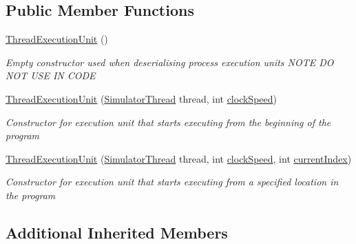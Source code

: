 \subsection*{Public Member Functions}
\begin{DoxyCompactItemize}
\item 
\hyperlink{class_c_p_u___o_s___simulator_1_1_operating___system_1_1_threading_1_1_thread_execution_unit_a7746c86206a5f1532a384792edfde2ae}{Thread\+Execution\+Unit} ()
\begin{DoxyCompactList}\small\item\em Empty constructor used when deserialising process execution units N\+O\+T\+E D\+O N\+O\+T U\+S\+E I\+N C\+O\+D\+E \end{DoxyCompactList}\item 
\hyperlink{class_c_p_u___o_s___simulator_1_1_operating___system_1_1_threading_1_1_thread_execution_unit_a68311fa0eed9a84bacba7743074e77fb}{Thread\+Execution\+Unit} (\hyperlink{class_c_p_u___o_s___simulator_1_1_operating___system_1_1_threading_1_1_simulator_thread}{Simulator\+Thread} thread, int \hyperlink{class_c_p_u___o_s___simulator_1_1_c_p_u_1_1_execution_unit_a0deb0a3e0c9fa402598bbf18be6535cc}{clock\+Speed})
\begin{DoxyCompactList}\small\item\em Constructor for execution unit that starts executing from the beginning of the program \end{DoxyCompactList}\item 
\hyperlink{class_c_p_u___o_s___simulator_1_1_operating___system_1_1_threading_1_1_thread_execution_unit_a840ba8746cda175b90f252c2aab3ecdb}{Thread\+Execution\+Unit} (\hyperlink{class_c_p_u___o_s___simulator_1_1_operating___system_1_1_threading_1_1_simulator_thread}{Simulator\+Thread} thread, int \hyperlink{class_c_p_u___o_s___simulator_1_1_c_p_u_1_1_execution_unit_a0deb0a3e0c9fa402598bbf18be6535cc}{clock\+Speed}, int \hyperlink{class_c_p_u___o_s___simulator_1_1_c_p_u_1_1_execution_unit_af6807cb5343acc2c40a08166c748f1f0}{current\+Index})
\begin{DoxyCompactList}\small\item\em Constructor for execution unit that starts executing from a specified location in the program \end{DoxyCompactList}\end{DoxyCompactItemize}
\subsection*{Additional Inherited Members}


